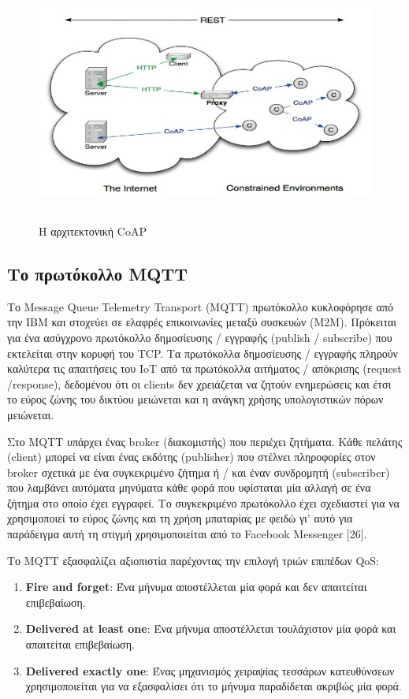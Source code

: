 	
\begin{figure}[htbp]
	\centering
		\includegraphics[height=8cm,width=12cm]{Figures/3.jpg}
	\caption{Η αρχιτεκτονική CoAP \cite{Coap} }	
\end{figure}

\subsection{Το πρωτόκολλο MQTT}
Το Message Queue Telemetry Transport (MQTT) πρωτόκολλο κυκλοφόρησε από την ΙΒΜ και στοχεύει σε ελαφρές επικοινωνίες μεταξύ συσκευών (Μ2Μ). Πρόκειται για ένα ασύγχρονο πρωτόκολλο δημοσίευσης / εγγραφής (publish / subscribe) που εκτελείται στην κορυφή του TCP.  Τα πρωτόκολλα δημοσίευσης / εγγραφής πληρούν καλύτερα τις απαιτήσεις του IoT από τα πρωτόκολλα αιτήματος / απόκρισης (request /response), δεδομένου ότι οι clients δεν χρειάζεται να ζητούν ενημερώσεις και έτσι το εύρος ζώνης του δικτύου μειώνεται και η ανάγκη χρήσης υπολογιστικών πόρων μειώνεται. 

Στο MQTT υπάρχει ένας broker (διακομιστής) που περιέχει ζητήματα. Κάθε πελάτης (client) μπορεί να είναι ένας εκδότης (publisher) που στέλνει πληροφορίες στον broker σχετικά με ένα συγκεκριμένο ζήτημα ή / και έναν συνδρομητή (subscriber) που λαμβάνει αυτόματα μηνύματα κάθε φορά που υφίσταται μία αλλαγή σε ένα ζήτημα στο οποίο έχει εγγραφεί. Το συγκεκριμένο πρωτόκολλο έχει σχεδιαστεί για να χρησιμοποιεί το εύρος ζώνης και τη χρήση μπαταρίας με φειδώ γι’ αυτό για παράδειγμα αυτή τη στιγμή χρησιμοποιείται από το Facebook Messenger [26]. 

Το ΜQTT εξασφαλίζει αξιοπιστία παρέχοντας την επιλογή τριών επιπέδων QoS: 
\begin{enumerate}
	\item{\textbf{Fire and forget}: Ένα μήνυμα αποστέλλεται μία φορά και δεν απαιτείται επιβεβαίωση.}
	\item{\textbf{Delivered at least one}: Ένα μήνυμα αποστέλλεται τουλάχιστον μία φορά και απαιτείται επιβεβαίωση.}
	\item{\textbf{Delivered exactly one}: Ένας μηχανισμός χειραψίας τεσσάρων κατευθύνσεων χρησιμοποιείται για να εξασφαλίσει ότι το μήνυμα παραδίδεται ακριβώς μία φορά. }
\end{enumerate}

